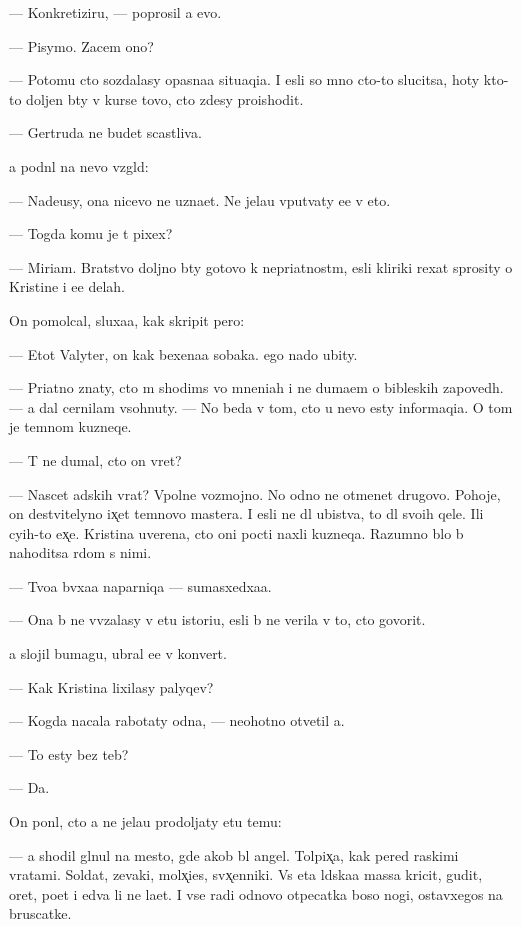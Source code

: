 \documentclass[10pt]{book}
\begin{document}
— Konkretiziru{\y}, — poprosil {\y}a {\y}evo.

— Pisymo. Zacem ono?

— Potomu cto sozdalasy opasna{\y}a situaqi{\y}a. I {\y}esli so mno{\y} cto-to slucitsa, hoty kto-to doljen b{\yi}ty v kurse tovo, cto zdesy pro{\y}ishodit.

— Gertruda ne budet scastliva.

{\Y}a podn{\ia}l na nevo vzgl{\ia}d:

— Nade{\y}usy, ona nicevo ne uzna{\y}et. Ne jela{\y}u vput{\yi}vaty {\y}e{\y}e v eto.

— Togda komu je t{\yi} pixex?

— Miriam. Bratstvo doljno b{\yi}ty gotovo k nepri{\y}atnost{\ia}m, {\y}esli kliriki rexat sprosity o Kristine i {\y}e{\y}e delah.

On pomolcal, sluxa{\y}a, kak skripit pero:

— Etot Valyter, on kak bexena{\y}a sobaka. {\Y}ego nado ubity.

— Pri{\y}atno znaty, cto m{\yi} shodims{\ia} vo mneni{\y}ah i ne duma{\y}em o bible{\y}skih zapoved{\ia}h. — {\Y}a dal cernilam v{\yi}sohnuty. — No beda v tom, cto u nevo {\y}esty informaqi{\y}a. O tom je temnom kuzneqe.

— T{\yi} ne dumal, cto on vret?

— Nascet adskih vrat? Vpolne vozmojno. No odno ne otmen{\ia}{\y}et drugovo. Pohoje, on de{\y}stvitelyno ix̨et temnovo mastera. I {\y}esli ne dl{\ia} ubi{\y}stva, to dl{\ia} svo{\y}ih qele{\y}. Ili cyih-to {\y}ex̨e. Kristina uverena, cto oni pocti naxli kuzneqa. Razumno b{\yi}lo b{\yi} nahoditsa r{\ia}dom s nimi.

— Tvo{\y}a b{\yi}vxa{\y}a naparniqa — sumasxedxa{\y}a.

— Ona b{\yi} ne vv{\ia}zalasy v etu istori{\y}u, {\y}esli b{\yi} ne verila v to, cto govorit.

{\Y}a slojil bumagu, ubral {\y}e{\y}e v konvert.

— Kak Kristina lixilasy palyqev?

— Kogda nacala rabotaty odna, — neohotno otvetil {\y}a.

— To {\y}esty bez teb{\ia}?

— Da.

On pon{\ia}l, cto {\y}a ne jela{\y}u prodoljaty etu temu:

— {\Y}a shodil gl{\ia}nul na mesto, gde {\y}akob{\yi} b{\yi}l angel. Tolpix̨a, kak pered ra{\y}skimi vratami. Soldat{\yi}, zevaki, mol{\ia}x̨i{\y}es{\ia}, sv{\ia}x̨enniki. Vs{\ia} eta l{\iu}dska{\y}a massa kricit, gudit, oret, po{\y}et i {\y}edva li ne la{\y}et. I vse radi odnovo otpecatka boso{\y} nogi, ostavxegos{\ia} na bruscatke.
\end{document}
